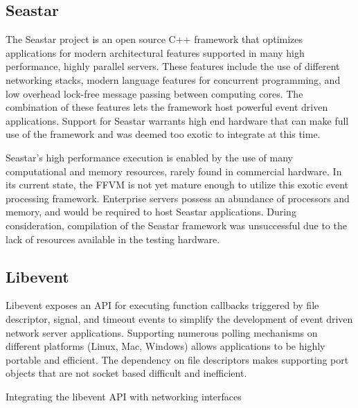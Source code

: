 \subsection{Seastar}
\label{related:seastar}
The Seastar project \cite{seastar} is an open source C++ framework that
optimizes applications for modern architectural features supported in many high
performance, highly parallel servers. These features include the use of different
networking stacks, modern language features for concurrent programming, and low
overhead lock-free message passing between computing cores. The combination of
these features lets the framework host powerful event driven applications.
Support for Seastar warrants high end hardware that can make full use of the
framework and was deemed too exotic to integrate at this time.

Seastar's high performance execution is enabled by the use of many computational
and memory resources, rarely found in commercial hardware. In its current state,
the FFVM is not yet mature enough to utilize this exotic event
processing framework. Enterprise servers possess an abundance of processors and
memory, and would be required to host Seastar applications. During consideration,
compilation of the Seastar framework was unsuccessful due to the lack of 
resources available in the testing hardware.

\subsection{Libevent}
\label{related:libevent}
Libevent \cite{libevent} exposes an API for executing function callbacks
triggered by file descriptor, signal, and timeout events to simplify the
development of event driven network server applications. Supporting numerous
polling mechanisms on different platforms (Linux, Mac, Windows) allows
applications to be highly portable and efficient. The dependency on file
descriptors makes supporting port objects that are not socket based difficult
and inefficient.

Integrating the libevent API with networking interfaces

